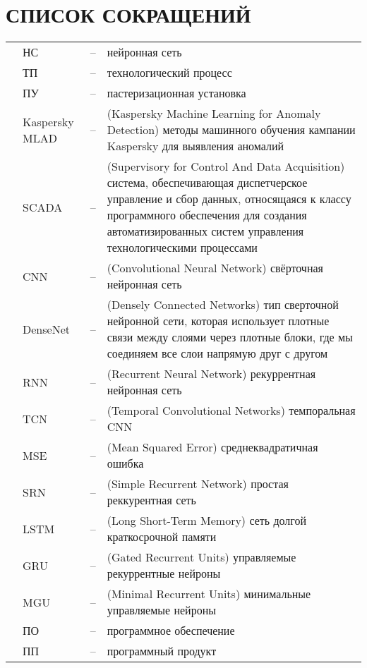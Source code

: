 \sectionbreak \section*{ 
    \gostTitleFont
    \redline
    СПИСОК СОКРАЩЕНИЙ
}
\titlespace

{\gostFont

\begin{tabular}{p{0.85cm} p{1.75cm} p{0.3cm} p{132.5mm}}
    & НС & {--} & нейронная сеть \\
    & ТП & {--} & технологический процесс \\
    & ПУ & {--} & пастеризационная установка \\
    & Kaspersky MLAD & {--} & (Kaspersky Machine Learning for Anomaly Detection) методы машинного обучения кампании Kaspersky для выявления аномалий \\
    & SCADA & {--} & (Supervisory for Control And Data Acquisition) система, обеспечивающая диспетчерское управление и сбор данных, относящаяся к классу программного обеспечения для создания автоматизированных систем управления технологическими процессами \\
    & CNN & {--} & (Convolutional Neural Network) свёрточная нейронная сеть \\
    & DenseNet & {--} & (Densely Connected Networks) тип сверточной нейронной сети, которая использует плотные связи между слоями через плотные блоки, где мы соединяем все слои напрямую друг с другом \\
    & RNN & {--} & (Recurrent Neural Network) рекуррентная нейронная сеть \\
    & TCN & {--} & (Temporal Convolutional Networks) темпоральная CNN \\
    & MSE & {--} & (Mean Squared Error) среднеквадратичная ошибка \\
    & SRN & {--} & (Simple Recurrent Network) простая реккурентная сеть \\
    & LSTM & {--} & (Long Short-Term Memory) сеть долгой краткосрочной памяти \\
    & GRU & {--} & (Gated Recurrent Units) управляемые рекуррентные нейроны \\
    & MGU & {--} & (Minimal Recurrent Units) минимальные управляемые нейроны \\
    & ПО & {--} & программное обеспечение \\
    & ПП & {--} & программный продукт \\
\end{tabular}

}
